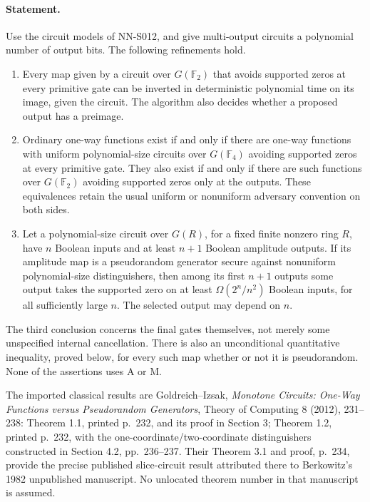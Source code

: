 \paragraph{Statement.}
Use the circuit models of NN-S012, and give multi-output circuits a
polynomial number of output bits. The following refinements hold.
\begin{enumerate}
\item Every map given by a circuit over $G(\mathbb F_2)$ that avoids
      supported zeros at every primitive gate can be inverted in
      deterministic polynomial time on its image, given the circuit.
      The algorithm also decides whether a proposed output has a preimage.
\item Ordinary one-way functions exist if and only if there are one-way
      functions with uniform polynomial-size circuits over
      $G(\mathbb F_4)$ avoiding supported zeros at every primitive gate.
      They also exist if and only if there are such functions over
      $G(\mathbb F_2)$ avoiding supported zeros only at the outputs.
      These equivalences retain the usual uniform or nonuniform
      adversary convention on both sides.
\item Let a polynomial-size circuit over $G(R)$, for a fixed finite
      nonzero ring $R$, have $n$ Boolean inputs and at least $n+1$ Boolean amplitude
      outputs. If its amplitude map is a pseudorandom generator secure
      against nonuniform polynomial-size distinguishers, then among
      its first $n+1$ outputs some output takes the supported zero on
      at least $\Omega(2^n/n^2)$ Boolean inputs, for all sufficiently
      large $n$. The selected output may depend on $n$.
\end{enumerate}
The third conclusion concerns the final gates themselves, not merely
some unspecified internal cancellation. There is also an unconditional
quantitative inequality, proved below, for every such map whether or
not it is pseudorandom. None of the assertions uses A or M.

The imported classical results are Goldreich--Izsak,
\emph{Monotone Circuits: One-Way Functions versus Pseudorandom
Generators}, Theory of Computing 8 (2012), 231--238:
Theorem 1.1, printed p.~232, and its proof in Section 3;
Theorem 1.2, printed p.~232, with the one-coordinate/two-coordinate
distinguishers constructed in Section 4.2, pp.~236--237.
Their Theorem 3.1 and proof, p.~234, provide the precise published
slice-circuit result attributed there to Berkowitz's 1982 unpublished
manuscript. No unlocated theorem number in that manuscript is assumed.

